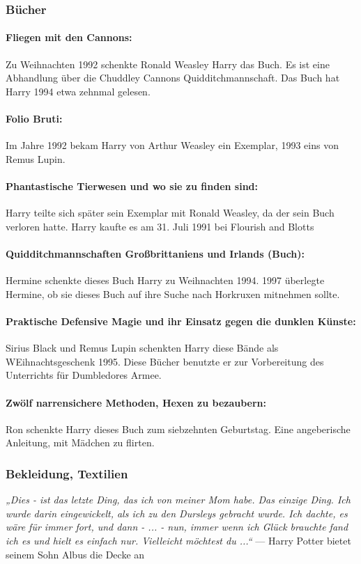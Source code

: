 \documentclass[a4paper, 10pt]{article}
\begin{document}
\subsubsection*{\large Bücher}
\paragraph{Fliegen mit den Cannons:}
Zu Weihnachten 1992 schenkte Ronald Weasley Harry das Buch. Es ist eine Abhandlung über die Chuddley Cannons Quidditchmannschaft. Das Buch hat Harry 1994 etwa zehnmal gelesen.
\paragraph{Folio Bruti:}
Im Jahre 1992 bekam Harry von Arthur Weasley ein Exemplar, 1993 eins von Remus Lupin.
\paragraph{Phantastische Tierwesen und wo sie zu finden sind:}
Harry teilte sich später sein Exemplar mit Ronald Weasley, da der sein Buch verloren hatte. Harry kaufte es am 31. Juli 1991 bei Flourish and Blotts
\paragraph{Quidditchmannschaften Großbrittaniens und Irlands (Buch):}
Hermine schenkte dieses Buch Harry zu Weihnachten 1994. 1997 überlegte Hermine, ob sie dieses Buch auf ihre Suche nach Horkruxen mitnehmen sollte.
\paragraph{Praktische Defensive Magie und ihr Einsatz gegen die dunklen Künste:}
Sirius Black und Remus Lupin schenkten Harry diese Bände als WEihnachtsgeschenk 1995. Diese Bücher benutzte er zur Vorbereitung des Unterrichts für Dumbledores Armee.
\paragraph{Zwölf narrensichere Methoden, Hexen zu bezaubern:}
Ron schenkte Harry dieses Buch zum siebzehnten Geburtstag. Eine angeberische Anleitung, mit Mädchen zu flirten.

\subsubsection*{\large Bekleidung, Textilien}
\textit{„Dies - ist das letzte Ding, das ich von meiner Mom habe. Das einzige Ding. Ich wurde darin eingewickelt, als ich zu den Dursleys gebracht wurde. Ich dachte, es wäre für immer fort, und dann - ... - nun, immer wenn ich Glück brauchte fand ich es und hielt es einfach nur. Vielleicht möchtest du ...“}
\vspace{10pt}
\newline
— Harry Potter bietet seinem Sohn Albus die Decke an
\end{document}
